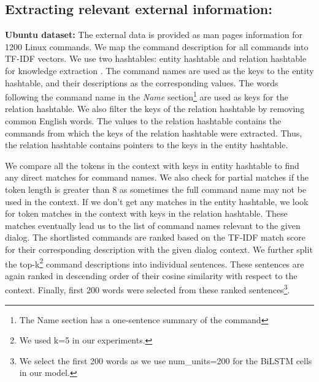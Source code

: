 \documentclass[letterpaper]{article} %
\begin{document}
\subsection{Extracting relevant external information:}
\textbf{Ubuntu dataset:} The external data is provided as man pages information for 1200 Linux commands.
We map the command description for all commands into TF-IDF vectors. We use two hashtables: entity hashtable and relation hashtable for knowledge extraction \cite{lowe2015incorporating}. The command names are used as the keys to the entity hashtable, and their descriptions as the corresponding values. The words following the command name in the \textit{Name} section\footnote{The Name section has a one-sentence summary of the command} are used as keys for the relation hashtable. We also filter the keys of the relation hashtable by removing common English words. The values to the relation hashtable contains the commands from which the keys of the relation hashtable were extracted. Thus, the relation hashtable contains pointers to the keys in the entity hashtable.

We compare all the tokens in the context with keys in entity hashtable to find any direct matches for command names. We also check for partial matches if the token length is greater than 8 as sometimes the full command name may not be used in the context. If we don't get any matches in the entity hashtable, we look for token matches in the context with keys in the relation hashtable.
These matches eventually lead us to the list of command names relevant to the given dialog.
The shortlisted commands are ranked based on the TF-IDF match score for their corresponding description with the given dialog context.
We further split the top-k\footnote{We used k=5 in our experiments.} command descriptions into individual sentences. These sentences are again ranked in descending order of their cosine similarity with respect to the context. Finally, first 200 words were selected from these ranked sentences\footnote{We select the first 200 words as we use num\_units=200 for the BiLSTM cells in our model.}.
\end{document}
